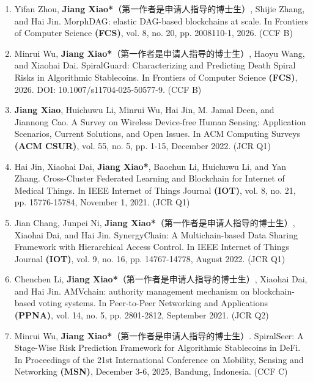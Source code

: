 {\begin{enumerate}[itemsep=0pt, topsep=0pt, parsep=0pt]
    \item Yifan Zhou, \textbf{Jiang Xiao*}（第一作者是申请人指导的博士生）, Shijie Zhang, and Hai Jin. MorphDAG: elastic DAG-based blockchains at scale. In Frontiers of Computer Science \textbf{(FCS)}, vol. 8, no. 20, pp. 2008110-1, 2026. (CCF B)

    \item Minrui Wu, \textbf{Jiang Xiao*}（第一作者是申请人指导的博士生）, Haoyu Wang, and Xiaohai Dai. SpiralGuard: Characterizing and Predicting Death Spiral Risks in Algorithmic Stablecoins. In Frontiers of Computer Science \textbf{(FCS)}, 2026. DOI: 10.1007/s11704-025-50577-9. (CCF B)

    \item \textbf{Jiang Xiao}, Huichuwu Li, Minrui Wu, Hai Jin, M. Jamal Deen, and Jiannong Cao. A Survey on Wireless Device-free Human Sensing: Application Scenarios, Current Solutions, and Open Issues. In ACM Computing Surveys \textbf{(ACM CSUR)}, vol. 55, no. 5, pp. 1-15, December 2022. (JCR Q1)

    \item Hai Jin, Xiaohai Dai, \textbf{Jiang Xiao*}, Baochun Li, Huichuwu Li, and Yan Zhang. Cross-Cluster Federated Learning and Blockchain for Internet of Medical Things. In IEEE Internet of Things Journal \textbf{(IOT)}, vol. 8, no. 21, pp. 15776-15784, November 1, 2021. (JCR Q1)

    \item Jian Chang, Junpei Ni, \textbf{Jiang Xiao*}（第一作者是申请人指导的博士生）, Xiaohai Dai, and Hai Jin. SynergyChain: A Multichain-based Data Sharing Framework with Hierarchical Access Control. In IEEE Internet of Things Journal \textbf{(IOT)}, vol. 9, no. 16, pp. 14767-14778, August 2022. (JCR Q1)

    \item Chenchen Li, \textbf{Jiang Xiao*}（第一作者是申请人指导的博士生）, Xiaohai Dai, and Hai Jin. AMVchain: authority management mechanism on blockchain-based voting systems. In Peer-to-Peer Networking and Applications \textbf{(PPNA)}, vol. 14, no. 5, pp. 2801-2812, September 2021. (JCR Q2)

    \item Minrui Wu, \textbf{Jiang Xiao*}（第一作者是申请人指导的博士生）. SpiralSeer: A Stage-Wise Risk Prediction Framework for Algorithmic Stablecoins in DeFi. In Proceedings of the 21st International Conference on Mobility, Sensing and Networking \textbf{(MSN)}, December 3-6, 2025, Bandung, Indonesia. (CCF C)


\end{enumerate}}
